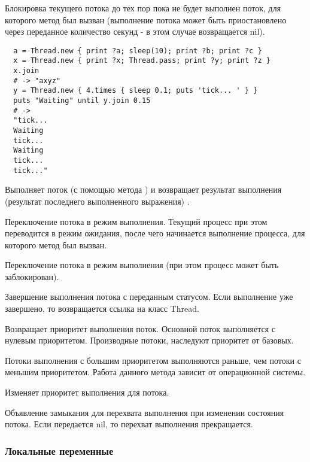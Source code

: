 \begin{methodlist}
  Блокировка текущего потока до тех пор пока не будет выполнен поток, для которого метод был вызван (выполнение потока может быть приостановлено через переданное количество секунд - в этом случае возвращается nil).
  \begin{verbatim}
  a = Thread.new { print ?a; sleep(10); print ?b; print ?c } 
  x = Thread.new { print ?x; Thread.pass; print ?y; print ?z } 
  x.join 
  # -> "axyz" 
  y = Thread.new { 4.times { sleep 0.1; puts 'tick... ' } } 
  puts "Waiting" until y.join 0.15 
  # -> 
  "tick... 
  Waiting 
  tick... 
  Waiting 
  tick... 
  tick..."
  \end{verbatim}

  Выполняет поток (с помощью метода ) и возвращает результат выполнения (результат последнего выполненного выражения) .

  Переключение потока в режим выполнения. Текущий процесс при этом переводится в режим ожидания, после чего начинается выполнение процесса, для которого метод был вызван. 

  Переключение потока в режим выполнения (при этом процесс может быть заблокирован).

  Завершение выполнения потока с переданным статусом. Если выполнение уже завершено, то возвращается ссылка на класс Thread. 
 
  Возвращает приоритет выполнения поток. Основной поток выполняется с нулевым приоритетом. Производные потоки, наследуют приоритет от базовых. 

  Потоки выполнения с большим приоритетом выполняются раньше, чем потоки с меньшим приоритетом. Работа данного метода зависит от операционной системы. 

  Изменяет приоритет выполнения для потока.

  Объявление замыкания для перехвата выполнения при изменении состояния потока. Если передается nil, то перехват выполнения прекращается.
\end{methodlist}

\subsubsection*{Локальные переменные}

